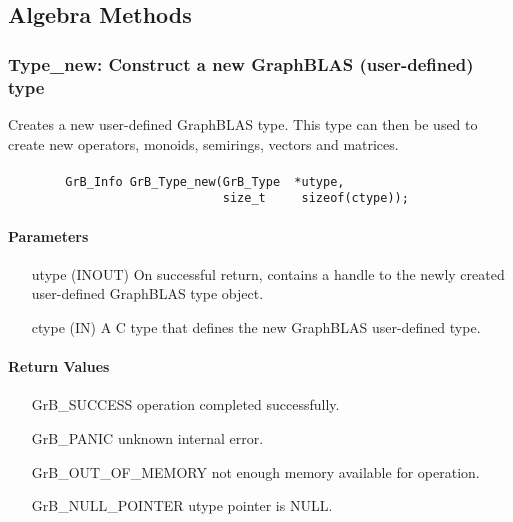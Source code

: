 \subsection{Algebra Methods}
\label{Sec:AlgebraMethods}


\subsubsection{{\sf Type\_new}: Construct a new GraphBLAS (user-defined) type}
\label{Sec:TypeNew}

Creates a new user-defined GraphBLAS type. This type can then be used to create new
operators, monoids, semirings, vectors and matrices.

\paragraph{\syntax}

\begin{verbatim}
        GrB_Info GrB_Type_new(GrB_Type  *utype,
                              size_t     sizeof(ctype));
\end{verbatim}

\paragraph{Parameters}

\begin{itemize}[leftmargin=1.1in]
    \item[{\sf utype}] ({\sf INOUT}) On successful return, contains a handle 
                                     to the newly created user-defined GraphBLAS 
                                     type object.
	\item[{\sf ctype}] ({\sf IN})    A C type that defines the new GraphBLAS 
                                     user-defined type.
\end{itemize}

\paragraph{Return Values}

\begin{itemize}[leftmargin=2.1in]
\item[{\sf GrB\_SUCCESS}]           operation completed successfully.
\item[{\sf GrB\_PANIC}]             unknown internal error.
\item[{\sf GrB\_OUT\_OF\_MEMORY}]          not enough memory available for operation.
\item[{\sf GrB\_NULL\_POINTER}]    {\sf utype} pointer is {\sf NULL}.
\end{itemize}

